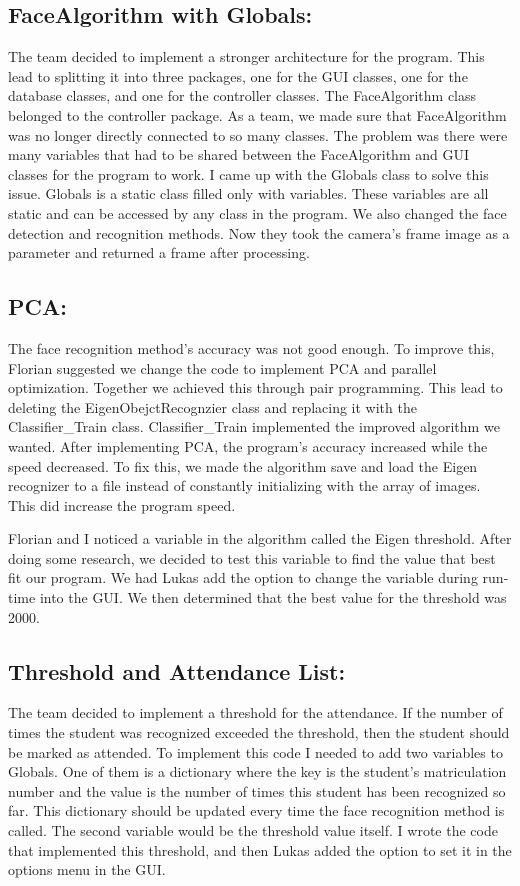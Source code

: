 \documentclass[12pt, a4paper]{article}
\begin{document}
\subsection{FaceAlgorithm with Globals:}
The team decided to implement a stronger architecture for the program. This lead to splitting it into three packages, one for the GUI classes, one for the database classes, and one for the controller classes. The FaceAlgorithm class belonged to the controller package. As a team, we made sure that FaceAlgorithm was no longer directly connected to so many classes. The problem was there were many variables that had to be shared between the FaceAlgorithm and GUI classes for the program to work. I came up with the Globals class to solve this issue. Globals is a static class filled only with variables. These variables are all static and can be accessed by any class in the program. We also changed the face detection and recognition methods. Now they took the camera’s frame image as a parameter and returned a frame after processing.

\subsection{PCA:}
The face recognition method’s accuracy was not good enough. To improve this, Florian suggested we change the code to implement PCA and parallel optimization. Together we achieved this through pair programming. This lead to deleting the EigenObejctRecognzier class and replacing it with the Classifier\_Train class. Classifier\_Train implemented the improved algorithm we wanted. After implementing PCA, the program’s accuracy increased while the speed decreased. To fix this, we made the algorithm save and load the Eigen recognizer to a file instead of constantly initializing with the array of images. This did increase the program speed.

Florian and I noticed a variable in the algorithm called the Eigen threshold. After doing some research, we decided to test this variable to find the value that best fit our program. We had Lukas add the option to change the variable during run-time into the GUI. We then determined that the best value for the threshold was 2000.

\subsection{Threshold and Attendance List:}
The team decided to implement a threshold for the attendance. If the number of times the student was recognized exceeded the threshold, then the student should be marked as attended. To implement this code I needed to add two variables to Globals. One of them is a dictionary where the key is the student’s matriculation number and the value is the number of times this student has been recognized so far. This dictionary should be updated every time the face recognition method is called. The second variable would be the threshold value itself. I wrote the code that implemented this threshold, and then Lukas added the option to set it in the options menu in the GUI.
\end{document}
